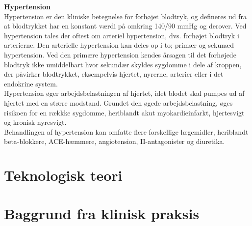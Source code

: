 \newpage

\textbf{Hypertension}\\
Hypertension er den kliniske betegnelse for forhøjet blodtryk, og defineres ud fra at blodtrykket har en konstant værdi på omkring 140/90 mmHg og derover. Ved hypertension tales der oftest om arteriel hypertension, dvs. forhøjet blodtryk i arterierne. Den arterielle hypertension kan deles op i to; primær og sekunæd hypertension. Ved den primære hypertension kendes årsagen til det forhøjede blodtryk ikke umiddelbart hvor sekundær skyldes sygdomme i dele af kroppen, der påvirker blodtrykket, eksempelvis hjertet, nyrerne, arterier eller i det endokrine system.\\
Hypertension øger arbejdsbelastningen af hjertet, idet blodet skal pumpes ud af hjertet med en større modstand. Grundet den øgede arbejdsbelastning, øges risikoen for en rækkke sygdomme, heriblandt akut myokardieinfarkt, hjertesvigt og kronisk nyresvigt. \\
Behandlingen af hypertension kan omfatte flere forskellige lægemidler, heriblandt beta-blokkere, ACE-hæmmere, angiotension, II-antagonister og diuretika.


\section{Teknologisk teori}

\section{Baggrund fra klinisk praksis}
